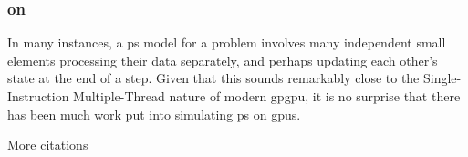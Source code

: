 
\subsubsection{ on }
In many instances, a \gls{ps} model for a problem involves many independent small elements processing their data separately, and perhaps updating each other's state at the end of a step.  Given that this sounds remarkably close to the Single-Instruction Multiple-Thread \cite[Ch. 4.4.1]{Hennessy2012} nature of modern \gls{gpgpu}, it is no surprise that there has been much work put into simulating \gls{ps} on \glspl{gpu}.

\begin{anfxwarning}{More citations}
\cite{Cecilia2010,Cecilia2010a,Cecilia2013,Macias-Ramos2015,Martinez-Del-Amor2015,Martinez-Del-Amor2013a,Maroosi2014,Maroosi2014a}
\end{anfxwarning}